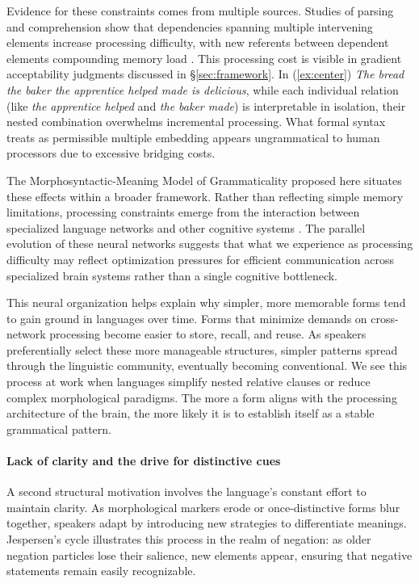 Evidence for these constraints comes from multiple sources. Studies of parsing and comprehension show that dependencies spanning multiple intervening elements increase processing difficulty, with new referents between dependent elements compounding memory load \autocite{gibson2000,Gibson2024}. This processing cost is visible in gradient acceptability judgments discussed in \S\ref{sec:framework}. In (\ref{ex:center}) \textit{The bread the baker the apprentice helped made is delicious}, while each individual relation (like \textit{the apprentice helped} and \textit{the baker made}) is interpretable in isolation, their nested combination overwhelms incremental processing. What formal syntax treats as permissible multiple embedding appears ungrammatical to human processors due to excessive bridging costs.

The Morphosyntactic-Meaning Model of Grammaticality proposed here situates these effects within a broader framework. Rather than reflecting simple memory limitations, processing constraints emerge from the interaction between specialized language networks and other cognitive systems \autocite{Fedorenko2024}. The parallel evolution of these neural networks suggests that what we experience as processing difficulty may reflect optimization pressures for efficient communication across specialized brain systems rather than a single cognitive bottleneck.

This neural organization helps explain why simpler, more memorable forms tend to gain ground in languages over time. Forms that minimize demands on cross-network processing become easier to store, recall, and reuse. As speakers preferentially select these more manageable structures, simpler patterns spread through the linguistic community, eventually becoming conventional. We see this process at work when languages simplify nested relative clauses or reduce complex morphological paradigms. The more a form aligns with the processing architecture of the brain, the more likely it is to establish itself as a stable grammatical pattern.

\paragraph{Lack of clarity and the drive for distinctive cues}

A second structural motivation involves the language’s constant effort to maintain clarity. As morphological markers erode or once-distinctive forms blur together, speakers adapt by introducing new strategies to differentiate meanings. Jespersen’s cycle illustrates this process in the realm of negation: as older negation particles lose their salience, new elements appear, ensuring that negative statements remain easily recognizable.

